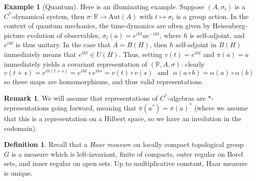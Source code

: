 \documentclass[aps,pra,showpacs,notitlepage,onecolumn,superscriptaddress,nofootinbib]{revtex4-1}
\theoremstyle{definition}
\newtheorem{definition}{Definition}[section]
\newtheorem{remark}{Remark}[section]
\newtheorem{example}{Example}[section]
\begin{document}
\begin{example}[Quantum]
   Here is an illuminating example. Suppose $(A, \sigma_t)$ is a $C^{*}$-dynamical system, then $\sigma : \mathbb{R} \rightarrow \text{Aut}(A)$ with $t \mapsto \sigma_t$ is a group action. In the context of quantum mechanics, the time-dynamics are often given by Heisenberg-picture evolution of observables, $\sigma_t(a) = e^{i h t} a e^{- i h t}$, where $h$ is self-adjoint, and $e^{iht}$ is thus unitary. In the case that $A = B(H)$, then $h$ self-adjoint in $B(H)$ immediately means that $e^{iht} \in U(H)$. Thus, setting $v(t) = e^{iht}$ and $\pi(a) = a$ immediately yields a covariant representation of $(\mathbb{R}, A, \sigma)$: clearly
   \begin{equation}
       v(t + s) = e^{i h (t + s)} = e^{iht} \circ e^{i h s} = v(t) \circ v(s) \ \ \ \text{and} \ \ \ \alpha(a \circ b) = \alpha(a) \circ \alpha(b)
   \end{equation}
   so these maps are homomorphisms, and thus valid representations.
\end{example}

\begin{remark}
    We will assume that representations of $C^{*}$-algebras are $*$-representations going forward, meaning that $\pi(a^{*}) = \pi(a)^{*}$ (where we assume that this is a representation on a Hilbert space, so we have an involution in the codomain).
\end{remark}

\begin{definition}
    Recall that a \emph{Haar measure} on locally compact topological group $G$ is a measure which is left-invariant, finite of compacts, outer regular on Borel sets, and inner regular on open sets. Up to multiplicative constant, Haar measure is unique.
\end{definition}
\end{document}
